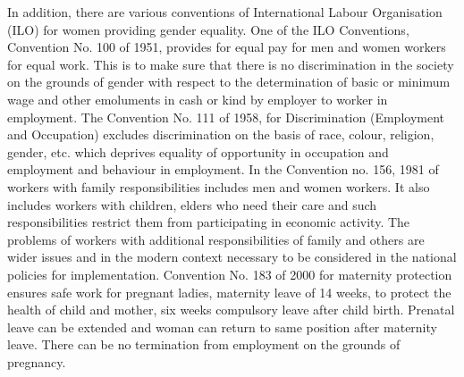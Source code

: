 \begin{multicols}{2}

\noi
In addition, there are various conventions of International Labour Organisation (ILO) for
women providing gender equality. One of the ILO Conventions, Convention No. 100 of
1951, provides for equal pay for men and women workers for equal work. This is to make
sure that there is no discrimination in the society on the grounds of gender with respect to the
determination of basic or minimum wage and other emoluments in cash or kind by employer
to worker in employment. The Convention No. 111 of 1958, for Discrimination (Employment
and Occupation) excludes discrimination on the basis of race, colour, religion, gender, etc.
which deprives equality of opportunity in occupation and employment and behaviour in
employment. In the Convention no. 156, 1981 of workers with family responsibilities
includes men and women workers. It also includes workers with children, elders who need
their care and such responsibilities restrict them from participating in economic activity. The
problems of workers with additional responsibilities of family and others are wider issues and
in the modern context necessary to be considered in the national policies for implementation.
Convention No. 183 of 2000 for maternity protection ensures safe work for pregnant ladies,
maternity leave of 14 weeks, to protect the health of child and mother, six weeks compulsory
leave after child birth. Prenatal leave can be extended and woman can return to same position
after maternity leave. There can be no termination from employment on the grounds of
pregnancy.

\vspace{-.15cm}


\end{multicols}
